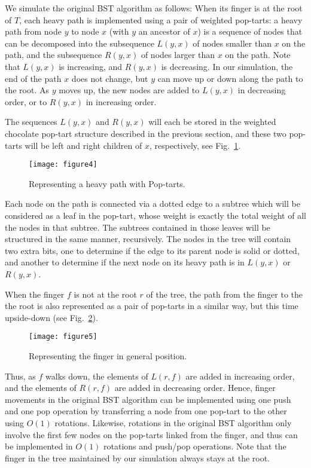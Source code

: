 \documentclass[11pt]{article}
\begin{document}
We simulate the original BST algorithm as follows: When its finger is at
the root of $T$, each heavy path is implemented using a pair of weighted
pop-tarts: a heavy path from node $y$ to node $x$ (with $y$ an ancestor
of $x$) is a sequence of nodes that can be decomposed into the
subsequence $L(y,x)$ of nodes smaller than $x$ on the path, and the
subsequence $R(y,x)$ of nodes larger than $x$ on the path. Note that
$L(y,x)$ is increasing, and $R(y,x)$ is decreasing. In our simulation,
the end of the path $x$ does not change, but $y$ can move up or down
along the path to the root. As $y$ moves up, the new nodes are added to
$L(y,x)$ in decreasing order, or to $R(y,x)$ in increasing order.

The sequences $L(y,x)$ and $R(y,x)$ will each be stored in the weighted
chocolate pop-tart structure described in the previous section, and
these two pop-tarts will be left and right children of $x$,
respectively, see Fig.~\ref{fig:double-pop-tart}.
\begin{figure}
\begin{center}
\texttt{[image: figure4]}
\end{center}
\caption{Representing a heavy path with Pop-tarts.}
\label{fig:double-pop-tart}
\end{figure}
Each node on the path is connected via a dotted edge to a subtree which
will be considered as a leaf in the pop-tart, whose weight is exactly
the total weight of all the nodes in that subtree. The subtrees
contained in those leaves will be structured in the same manner,
recursively.  The nodes in the tree will contain two extra bits, one to
determine if the edge to its parent node is solid or dotted, and another
to determine if the next node on its heavy path is in $L(y,x)$ or
$R(y,x)$.

When the finger $f$ is not at the root $r$ of the tree, the path from
the finger to the the root is also represented as a pair of pop-tarts in
a similar way, but this time upside-down (see Fig.~\ref{fig:finger}).
\begin{figure}
\begin{center}
\texttt{[image: figure5]}
\end{center}
\caption{Representing the finger in general position.}
\label{fig:finger}
\end{figure}
Thus, as $f$ walks down, the elements of $L(r,f)$ are added in
increasing order, and the elements of $R(r,f)$ are added in decreasing
order.  Hence, finger movements in the original BST algorithm can be
implemented using one push and one pop operation by transferring a node
from one pop-tart to the other using $O(1)$ rotations. Likewise,
rotations in the original BST algorithm only involve the first few nodes
on the pop-tarts linked from the finger, and thus can be implemented in
$O(1)$ rotations and push/pop operations. Note that the finger in the
tree maintained by our simulation always stays at the root.
\end{document}
